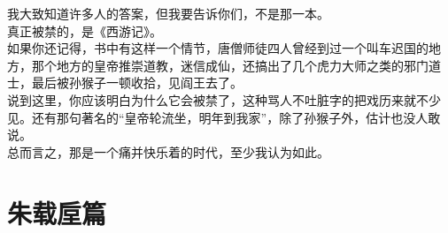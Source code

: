 \begin{multicols}{\theparacolNo}
我大致知道许多人的答案，但我要告诉你们，不是那一本。\\

真正被禁的，是《西游记》。\\

如果你还记得，书中有这样一个情节，唐僧师徒四人曾经到过一个叫车迟国的地方，那个地方的皇帝推崇道教，迷信成仙，还搞出了几个虎力大师之类的邪门道士，最后被孙猴子一顿收拾，见阎王去了。\\

说到这里，你应该明白为什么它会被禁了，这种骂人不吐脏字的把戏历来就不少见。还有那句著名的“皇帝轮流坐，明年到我家”，除了孙猴子外，估计也没人敢说。\\

总而言之，那是一个痛并快乐着的时代，至少我认为如此。\\
\ifnum{}
	\end{multicols}
\fi
\newpage

\chapter*{朱载垕篇}
